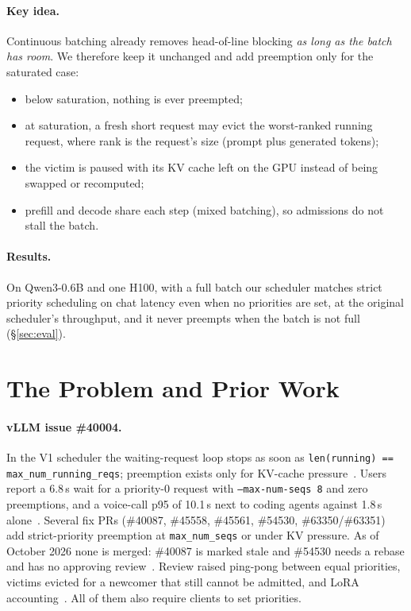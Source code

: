 \documentclass[11pt]{article}
\newcommand{\maxseqs}{\texttt{max\_num\_seqs}}
\begin{document}
\paragraph{Key idea.} Continuous batching already removes head-of-line blocking \emph{as long as the
batch has room}. We therefore keep it unchanged and add preemption only for the saturated case:
\begin{itemize}
  \item below saturation, nothing is ever preempted;
  \item at saturation, a fresh short request may evict the worst-ranked running request, where rank
    is the request's size (prompt plus generated tokens);
  \item the victim is paused with its KV cache left on the GPU instead of being swapped or recomputed;
  \item prefill and decode share each step (mixed batching), so admissions do not stall the batch.
\end{itemize}

\paragraph{Results.} On Qwen3-0.6B and one H100, with a full batch our scheduler matches strict
priority scheduling on chat latency even when no priorities are set, at the original scheduler's
throughput, and it never preempts when the batch is not full (\S\ref{sec:eval}).

\section{The Problem and Prior Work}
\label{sec:related}

\paragraph{vLLM issue \#40004.} In the V1 scheduler the waiting-request loop stops as soon as
\texttt{len(running) == max\_num\_running\_reqs}; preemption exists only for KV-cache
pressure~\cite{issue40004}. Users report a 6.8\,s wait for a priority-0 request with
\texttt{--max-num-seqs 8} and zero preemptions, and a voice-call p95 of 10.1\,s next to coding agents
against 1.8\,s alone~\cite{issue40004}. Several fix PRs (\#40087, \#45558, \#45561, \#54530,
\#63350/\#63351) add strict-priority preemption at \maxseqs{} or under KV pressure. As of October 2026
none is merged: \#40087 is marked stale and \#54530 needs a rebase and has no approving
review~\cite{pr40087,pr54530}. Review raised ping-pong between equal priorities, victims evicted for a
newcomer that still cannot be admitted, and LoRA accounting~\cite{issue40004,pr54530}. All of them
also require clients to set priorities.
\end{document}
